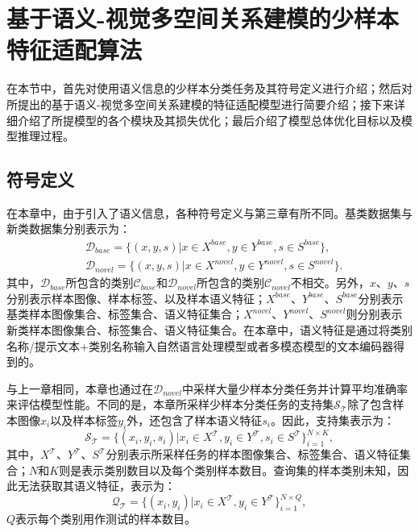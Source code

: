 \section[\hspace{-2pt}基于语义-视觉多空间关系建模的少样本特征适配算法]{{\heiti{} \hspace{-8pt}基于语义-视觉多空间关系建模的少样本特征适配算法}}\label{section4: 基于语义-视觉多空间关系建模的少样本特征适配算法}

在本节中，首先对使用语义信息的少样本分类任务及其符号定义进行介绍；然后对所提出的基于语义-视觉多空间关系建模的特征适配模型进行简要介绍；接下来详细介绍了所提模型的各个模块及其损失优化；最后介绍了模型总体优化目标以及模型推理过程。

\subsection[\hspace{-2pt}符号定义]{{\heiti{} \hspace{-8pt}符号定义}}\label{section4: 符号定义}

在本章中，由于引入了语义信息，各种符号定义与第三章有所不同。基类数据集与新类数据集分别表示为：
\begin{equation}
  \begin{aligned}
     & \mathcal{D}_{base} = \{(x, y, s)|x \in X^{base}, y \in Y^{base}, s \in S^{base}\},     \\
     & \mathcal{D}_{novel} = \{(x, y, s)|x \in X^{novel}, y \in Y^{novel}, s \in S^{novel}\}.
  \end{aligned}
\end{equation}
其中，$\mathcal{D}_{base}$所包含的类别$\mathcal{C}_{base}$和$\mathcal{D}_{novel}$所包含的类别$\mathcal{C}_{novel}$不相交。另外，$x$、$y$、$s$分别表示样本图像、样本标签、以及样本语义特征；$X^{base}$、$Y^{base}$、$S^{base}$分别表示基类样本图像集合、标签集合、语义特征集合；$X^{novel}$、$Y^{novel}$、$S^{novel}$则分别表示新类样本图像集合、标签集合、语义特征集合。在本章中，语义特征是通过将类别名称/提示文本+类别名称输入自然语言处理模型或者多模态模型的文本编码器得到的。

与上一章相同，本章也通过在$\mathcal{D}_{novel}$中采样大量少样本分类任务并计算平均准确率来评估模型性能。不同的是，本章所采样少样本分类任务的支持集$\mathcal{S}_{\mathcal{T}}$除了包含样本图像$x_i$以及样本标签$y_i$外，还包含了样本语义特征$s_i$。因此，支持集表示为：
\begin{equation}
  \mathcal{S}_{\mathcal{T}} = \{(x_i, y_i, s_i)|x_i \in X^{\mathcal{T}}, y_i \in Y^{\mathcal{T}}, s_i \in S^{\mathcal{T}}\}_{i=1}^{N \times K},
\end{equation}
其中，$X^{\mathcal{T}}$、$Y^{\mathcal{T}}$、$S^{\mathcal{T}}$分别表示所采样任务的样本图像集合、标签集合、语义特征集合；$N$和$K$则是表示类别数目以及每个类别样本数目。查询集的样本类别未知，因此无法获取其语义特征，表示为：
\begin{equation}
  \mathcal{Q}_{\mathcal{T}} = \{(x_i, y_i)|x_i \in X^{\mathcal{T}}, y_i \in Y^{\mathcal{T}}\}_{i=1}^{N \times Q},
\end{equation}
$Q$表示每个类别用作测试的样本数目。

